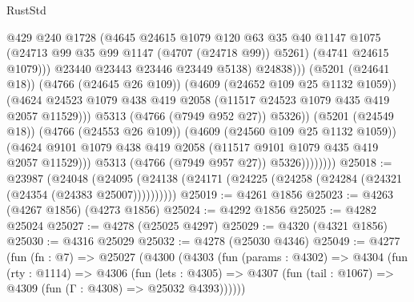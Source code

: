 \begin{lexlean}{RustStd}
\begin{coremodule}
{\begin{coremodule}
{{{{{{{{{{{{{{{{{{{{{{{{{{{{{{{{{{{                                      @429
                                      @240
                                      @1728
                                      (@4645
                                        @24615
                                        @1079
                                        @120
                                        @63
                                        @35
                                        @40
                                        @1147
                                        @1075
                                        (@24713 @99 @35 @99 @1147 (@4707 (@24718 @99)) @5261)
                                        (@4741 @24615 @1079)))
                                    @23440
                                    @23443
                                    @23446
                                    @23449
                                    @5138)
                                  @24838)))
                            (@5201 (@24641 @18))
                            (@4766 (@24645 @26 @109))
                            (@4609 (@24652 @109 @25 @1132 @1059))
                            (@4624
                              @24523
                              @1079
                              @438
                              @419
                              @2058
                              (@11517 @24523 @1079 @435 @419 @2057 @11529)))
                          @5313
                          (@4766 (@7949 @952 @27))
                          @5326))
                      (@5201 (@24549 @18))
                      (@4766 (@24553 @26 @109))
                      (@4609 (@24560 @109 @25 @1132 @1059))
                      (@4624
                        @9101
                        @1079
                        @438
                        @419
                        @2058
                        (@11517 @9101 @1079 @435 @419 @2057 @11529)))
                    @5313
                    (@4766 (@7949 @957 @27))
                    @5326))))))))
@25018 := @23987
    (@24048 (@24095 (@24138 (@24171 (@24225 (@24258 (@24284 (@24321 (@24354 (@24383 @25007))))))))))
@25019 := @4261 @1856
@25023 := @4263 (@4267 @1856) (@4273 @1856)
@25024 := @4292 @1856
@25025 := @4282 @25024
@25027 := @4278 (@25025 @4297)
@25029 := @4320 (@4321 @1856)
@25030 := @4316 @25029
@25032 := @4278 (@25030 @4346)
@25049 := @4277
    (fun (fn : @7) =>
    @25027
      (@4300
        (@4303
          (fun (params : @4302) =>
          @4304
            (fun (rty : @1114) =>
            @4306
              (fun (lets : @4305) =>
              @4307 (fun (tail : @1067) => @4309 (fun (Γ : @4308) => @25032 @4393))))))
}}}}}}}}}}}}}}}}}}}}}}}}}}}}}}}}}}}
\end{coremodule}}
\end{coremodule}
\end{lexlean}
